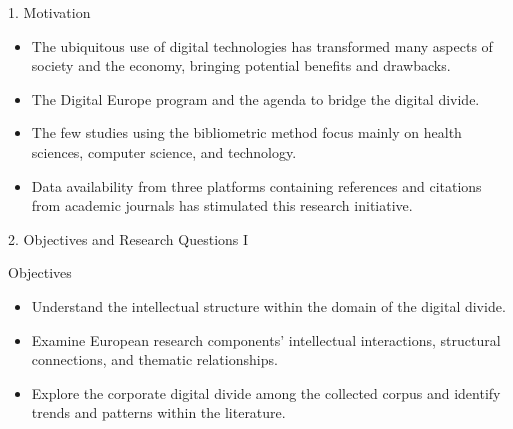 \documentclass[
  ignorenonframetext,
]{beamer}
\begin{document}
\begin{frame}{1. Motivation}
\protect\hypertarget{motivation}{}
\begin{itemize}
\item
  The ubiquitous use of digital technologies has transformed many
  aspects of society and the economy, bringing potential benefits and
  drawbacks.
\item
  The Digital Europe program and the agenda to bridge the digital
  divide.
\item
  The few studies using the bibliometric method focus mainly on health
  sciences, computer science, and technology.
\item
  Data availability from three platforms containing references and
  citations from academic journals has stimulated this research
  initiative.
\end{itemize}
\end{frame}

\begin{frame}{2. Objectives and Research Questions I}
\protect\hypertarget{objectives-and-research-questions-i}{}
\begin{block}{Objectives}
\protect\hypertarget{objectives}{}
\begin{itemize}
\item
  Understand the intellectual structure within the domain of the digital
  divide.
\item
  Examine European research components' intellectual interactions,
  structural connections, and thematic relationships.
\item
  Explore the corporate digital divide among the collected corpus and
  identify trends and patterns within the literature.
\end{itemize}
\end{block}
\end{frame}
\end{document}
